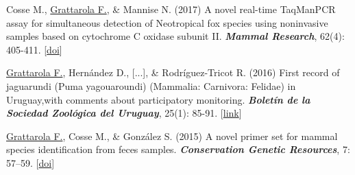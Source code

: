 \documentclass[9pt]{developercv} %
\begin{document}
\begin{etaremune}
\item Cosse M., \underline{Grattarola F.},  \& Mannise N. (2017) A novel real-time TaqMan\texttrademark PCR assay for simultaneous detection of Neotropical fox species using noninvasive samples based on cytochrome C oxidase subunit II. \textit{\textbf{Mammal Research}}, 62(4): 405-411. [\href{https://doi.org/10.1007/s13364-017-0328-y}{doi}]

\item \underline{Grattarola F.}, Hernández D., [...], \& Rodríguez-Tricot R. (2016) First record of jaguarundi (Puma yagouaroundi) (Mammalia: Carnivora: Felidae) in Uruguay,with comments about  participatory monitoring. \textit{\textbf{Boletín de la Sociedad Zoológica del Uruguay}}, 25(1): 85-91. [\href{http://szu.org.uy/journal/index.php/Bol_SZU/article/view/23}{link}]

\item \underline{Grattarola F.}, Cosse M., \& González S. (2015) A novel primer set for mammal species identification from feces samples. \textit{\textbf{Conservation Genetic Resources}}, 7: 57–59. [\href{https://doi.org/10.1007/s12686-014-0359-5}{doi}]

\end{etaremune}


\end{document}
